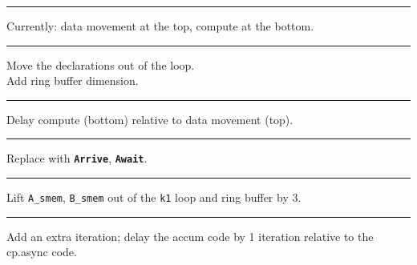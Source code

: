 \newpage
{}

{\large

}

\vspace{3mm}
\hrule

{\LARGE
Currently: data movement at the top, compute at the bottom.
}

\newpage
{}

{\large

}

\vspace{3mm}
\hrule
\vspace{-2mm}

{\LARGE
Move the  declarations out of the  loop.\\
Add ring buffer dimension.
}

\newpage
{}

{\large

}

\vspace{3mm}
\hrule

{\LARGE
Delay compute (bottom) relative to data movement (top).
}

\newpage
{}

{\large

}

\vspace{3mm}
\hrule

{\LARGE
Replace with \textbf{\texttt{Arrive}}, \textbf{\texttt{Await}}.
}

\newpage
{}

{\large

}

\vspace{3mm}
\hrule

{\LARGE

Lift \texttt{A\_smem}, \texttt{B\_smem} out of the \texttt{k1} loop and ring buffer by 3.

}

\newpage
{}

{\large

}

\vspace{3mm}
\hrule

{\LARGE

Add an extra  iteration; delay the accum code by 1 iteration relative to the cp.async code.

}

